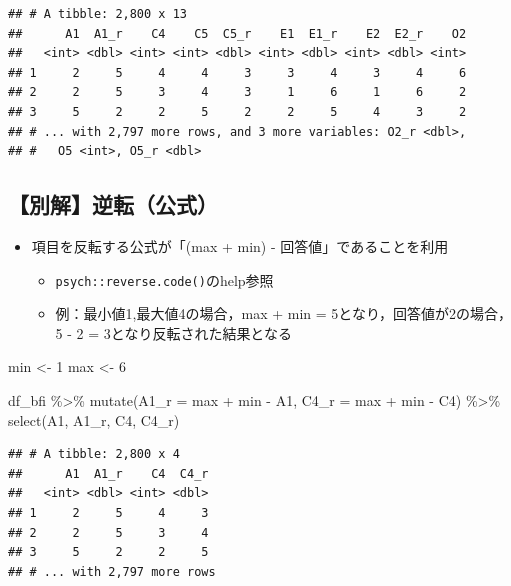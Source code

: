 \documentclass[
  xelatex,ja=standard, b5paper]{bxjsbook}
\newenvironment{Shaded}{\begin{snugshade}}{\end{snugshade}}
\newcommand{\AttributeTok}[1]{\textcolor[rgb]{0.77,0.63,0.00}{#1}}
\newcommand{\DecValTok}[1]{\textcolor[rgb]{0.00,0.00,0.81}{#1}}
\newcommand{\FunctionTok}[1]{\textcolor[rgb]{0.00,0.00,0.00}{#1}}
\newcommand{\NormalTok}[1]{#1}
\newcommand{\OtherTok}[1]{\textcolor[rgb]{0.56,0.35,0.01}{#1}}
\newcommand{\SpecialCharTok}[1]{\textcolor[rgb]{0.00,0.00,0.00}{#1}}
\providecommand{\tightlist}{%
  \setlength{\itemsep}{0pt}\setlength{\parskip}{0pt}}
\begin{document}
\begin{verbatim}
## # A tibble: 2,800 x 13
##      A1  A1_r    C4    C5  C5_r    E1  E1_r    E2  E2_r    O2
##   <int> <dbl> <int> <int> <dbl> <int> <dbl> <int> <dbl> <int>
## 1     2     5     4     4     3     3     4     3     4     6
## 2     2     5     3     4     3     1     6     1     6     2
## 3     5     2     2     5     2     2     5     4     3     2
## # ... with 2,797 more rows, and 3 more variables: O2_r <dbl>,
## #   O5 <int>, O5_r <dbl>
\end{verbatim}

\hypertarget{mu-rev-rule}{%
\subsection{【別解】逆転（公式）}\label{mu-rev-rule}}

\begin{itemize}
\tightlist
\item
  項目を反転する公式が「(max + min) - 回答値」であることを利用

  \begin{itemize}
  \tightlist
  \item
    \texttt{psych::reverse.code()}のhelp参照
  \item
    例：最小値1,最大値4の場合，max + min = 5となり，回答値が2の場合，5 - 2 = 3となり反転された結果となる
  \end{itemize}
\end{itemize}

\begin{Shaded}
\begin{Highlighting}[]
\NormalTok{min }\OtherTok{\textless{}{-}} \DecValTok{1}
\NormalTok{max }\OtherTok{\textless{}{-}} \DecValTok{6}

\NormalTok{df\_bfi }\SpecialCharTok{\%\textgreater{}\%} 
  \FunctionTok{mutate}\NormalTok{(}\AttributeTok{A1\_r =}\NormalTok{ max }\SpecialCharTok{+}\NormalTok{ min }\SpecialCharTok{{-}}\NormalTok{ A1,}
         \AttributeTok{C4\_r =}\NormalTok{ max }\SpecialCharTok{+}\NormalTok{ min }\SpecialCharTok{{-}}\NormalTok{ C4) }\SpecialCharTok{\%\textgreater{}\%} 
  \FunctionTok{select}\NormalTok{(A1, A1\_r, C4, C4\_r)}
\end{Highlighting}
\end{Shaded}

\begin{verbatim}
## # A tibble: 2,800 x 4
##      A1  A1_r    C4  C4_r
##   <int> <dbl> <int> <dbl>
## 1     2     5     4     3
## 2     2     5     3     4
## 3     5     2     2     5
## # ... with 2,797 more rows
\end{verbatim}
\end{document}
